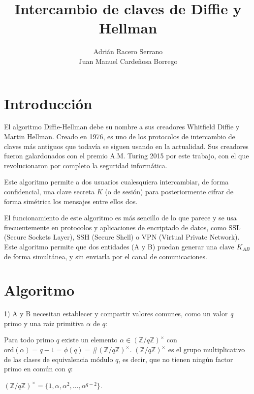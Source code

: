 \documentclass[11pt]{article}
\title{\textbf{\huge Intercambio de claves de Diffie y Hellman}}
\author{Adrián Racero Serrano\\Juan Manuel Cardeñosa Borrego}
\date{}
\begin{document}
\maketitle

\thispagestyle{empty}

\newpage

\setcounter{page}{1}
\tableofcontents

\newpage

\section{Introducción}
El algoritmo Diffie-Hellman debe su nombre a sus creadores Whitfield Diffie y Martin Hellman. Creado en 1976, es uno de los protocolos de intercambio de claves más antiguos que todavía se siguen usando en la actualidad. Sus creadores fueron galardonados con el premio A.M. Turing 2015 por este trabajo, con el que revolucionaron por completo la seguridad informática.

Este algoritmo permite a dos usuarios cualesquiera intercambiar, de forma confidencial, una clave secreta $K$ (o de sesión) para posteriormente cifrar de forma simétrica los mensajes entre ellos dos.

El funcionamiento de este algoritmo es más sencillo de lo que parece y se usa frecuentemente en protocolos y aplicaciones de encriptado de datos, como SSL (Secure Sockets Layer), SSH (Secure Shell) o VPN (Virtual Private Network). Este algoritmo permite que dos entidades (A y B) puedan generar una clave $K_{AB}$ de forma simultánea, y sin enviarla por el canal de comunicaciones.

\section{Algoritmo}
1) A y B necesitan establecer y compartir valores comunes, como un valor \textit{q} primo y una raíz primitiva $\alpha$  de $q$:

Para todo primo $q$ existe un elemento $\alpha \in (\mathbb{Z}/q\mathbb{Z})^{\times}$ con $\text{ord}(\alpha) = q - 1 = \phi(q) =  \# (\mathbb{Z}/q\mathbb{Z})^{\times}$.
$(\mathbb{Z}/q\mathbb{Z})^{\times}$ es el grupo multiplicativo de las clases de equivalencia módulo $q$, es decir, que no tienen ningún factor primo en común con $q$:
\begin{center}
$(\mathbb{Z}/q\mathbb{Z})^{\times} = \{1, \alpha, \alpha^2, \ldots, \alpha^{q-2}\}$.\\
\end{center}
\end{document}
